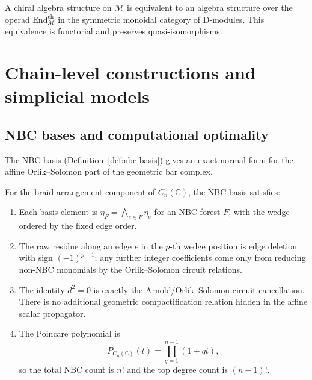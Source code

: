 \begin{theorem}
\label{thm:chiral-algebra-objects}
A chiral algebra structure on $\mathcal{M}$ is equivalent to an algebra structure over the operad
$\text{End}_{\mathcal{M}}^{\text{ch}}$ in the symmetric monoidal category of D-modules. This equivalence is functorial and preserves quasi-isomorphisms.
\end{theorem}


 \section{Chain-level constructions and simplicial models}

\subsection{NBC bases and computational optimality}

The NBC basis (Definition~\ref{def:nbc-basis}) gives an exact normal
form for the affine Orlik--Solomon part of the geometric bar complex.

\begin{theorem}
\label{thm:nbc-basis-optimality}
For the braid arrangement component of $C_n(\mathbb C)$, the NBC basis
satisfies:
\begin{enumerate}
\item Each basis element is
$\eta_F=\bigwedge_{e\in F}\eta_e$ for an NBC forest $F$, with the wedge
ordered by the fixed edge order.
\item The raw residue along an edge $e$ in the $p$-th wedge position is
edge deletion with sign $(-1)^{p-1}$; any further integer coefficients
come only from reducing non-NBC monomials by the Orlik--Solomon circuit
relations.
\item The identity $d^2=0$ is exactly the Arnold/Orlik--Solomon circuit
cancellation. There is no additional geometric compactification relation
hidden in the affine scalar propagator.
\item The Poincare polynomial is
\[
P_{C_n(\mathbb C)}(t)=\prod_{q=1}^{n-1}(1+qt),
\]
so the total NBC count is $n!$ and the top degree count is
$(n-1)!$.
\end{enumerate}
\end{theorem}

